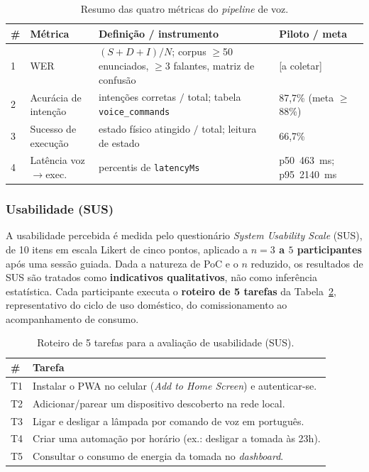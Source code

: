 \begin{table}[H]
\centering
\caption{Resumo das quatro métricas do \textit{pipeline} de voz.}
\label{tab:metricas}
\small
\begin{tabular}{@{}p{0.5cm}p{3.0cm}p{4.4cm}p{3.4cm}@{}}
\toprule
\textbf{\#} & \textbf{Métrica} & \textbf{Definição / instrumento} & \textbf{Piloto / meta} \\
\midrule
1 & WER & $(S{+}D{+}I)/N$; corpus $\geq$50 enunciados, $\geq$3 falantes, matriz de confusão & [a coletar] \\
2 & Acurácia de intenção & intenções corretas $/$ total; tabela \texttt{voice\_commands} & 87,7\% (meta $\geq$88\%) \\
3 & Sucesso de execução & estado físico atingido $/$ total; leitura de estado & 66,7\% \\
4 & Latência voz$\to$exec. & percentis de \texttt{latencyMs} & p50~463~ms; p95~2140~ms \\
\bottomrule
\end{tabular}
\end{table}

\subsubsection{Usabilidade (SUS)}

A usabilidade percebida é medida pelo questionário \textit{System Usability Scale} (SUS),
de 10 itens em escala Likert de cinco pontos, aplicado a \textbf{$n = 3$ a $5$
participantes} após uma sessão guiada. Dada a natureza de PoC e o $n$ reduzido, os
resultados de SUS são tratados como \textbf{indicativos qualitativos}, não como inferência
estatística. Cada participante executa o \textbf{roteiro de 5 tarefas} da
Tabela~\ref{tab:roteiro-sus}, representativo do ciclo de uso doméstico, do comissionamento ao
acompanhamento de consumo. %

\begin{table}[H]
\centering
\caption{Roteiro de 5 tarefas para a avaliação de usabilidade (SUS).}
\label{tab:roteiro-sus}
\small
\begin{tabular}{@{}p{0.6cm}p{12.4cm}@{}}
\toprule
\textbf{\#} & \textbf{Tarefa} \\
\midrule
T1 & Instalar o PWA no celular (\textit{Add to Home Screen}) e autenticar-se. \\
T2 & Adicionar/parear um dispositivo descoberto na rede local. \\
T3 & Ligar e desligar a lâmpada por comando de voz em português. \\
T4 & Criar uma automação por horário (ex.: desligar a tomada às 23h). \\
T5 & Consultar o consumo de energia da tomada no \textit{dashboard}. \\
\bottomrule
\end{tabular}
\end{table}

